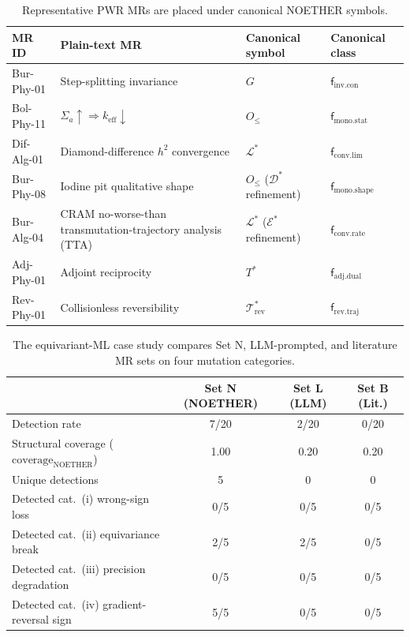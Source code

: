 \documentclass[acmsmall,screen,anonymous,review]{acmart}
\begin{document}
\begin{table}[h]
\centering
\caption{Representative PWR MRs are placed under canonical NOETHER symbols.}
\label{tab:elementwise}
\footnotesize
\begin{tabular}{llll}
\toprule
\textbf{MR ID} & \textbf{Plain-text MR} & \textbf{Canonical symbol} & \textbf{Canonical class} \\
\midrule
Bur-Phy-01 & Step-splitting invariance & $G$ & $\mathsf{f}_{\mathrm{inv}.\mathrm{con}}$ \\
Bol-Phy-11 & $\Sigma_a\!\uparrow \Rightarrow k_{\mathrm{eff}}\!\downarrow$ & $O_{\le}$ & $\mathsf{f}_{\mathrm{mono}.\mathrm{stat}}$ \\
Dif-Alg-01 & Diamond-difference $h^2$ convergence & $\mathcal{L}^{*}$ & $\mathsf{f}_{\mathrm{conv}.\mathrm{lim}}$ \\
Bur-Phy-08 & Iodine pit qualitative shape & $O_{\le}$ ($\mathcal{D}^{*}$ refinement) & $\mathsf{f}_{\mathrm{mono}.\mathrm{shape}}$ \\
Bur-Alg-04 & CRAM no-worse-than transmutation-trajectory analysis (TTA) & $\mathcal{L}^{*}$ ($\mathcal{E}^{*}$ refinement) & $\mathsf{f}_{\mathrm{conv}.\mathrm{rate}}$ \\
Adj-Phy-01 & Adjoint reciprocity & $T^{*}$ & $\mathsf{f}_{\mathrm{adj}.\mathrm{dual}}$ \\
Rev-Phy-01 & Collisionless reversibility & $\mathcal{T}^{*}_{\mathrm{rev}}$ & $\mathsf{f}_{\mathrm{rev}.\mathrm{traj}}$ \\
\bottomrule
\end{tabular}
\end{table}

\begin{table}[h]
\centering
\caption{The equivariant-ML case study compares Set N, LLM-prompted, and literature MR sets on four mutation categories.}
\label{tab:case-study}
\small
\begin{tabular}{lccc}
\toprule
& Set N (NOETHER) & Set L (LLM) & Set B (Lit.) \\
\midrule
Detection rate & 7/20 & 2/20 & 0/20 \\
Structural coverage ($\mathrm{coverage}_{\mathrm{NOETHER}}$) & 1.00 & 0.20 & 0.20 \\
Unique detections & 5 & 0 & 0 \\
Detected cat.~(i) wrong-sign loss & 0/5 & 0/5 & 0/5 \\
Detected cat.~(ii) equivariance break & 2/5 & 2/5 & 0/5 \\
Detected cat.~(iii) precision degradation & 0/5 & 0/5 & 0/5 \\
Detected cat.~(iv) gradient-reversal sign & 5/5 & 0/5 & 0/5 \\
\bottomrule
\end{tabular}
\end{table}
\end{document}
